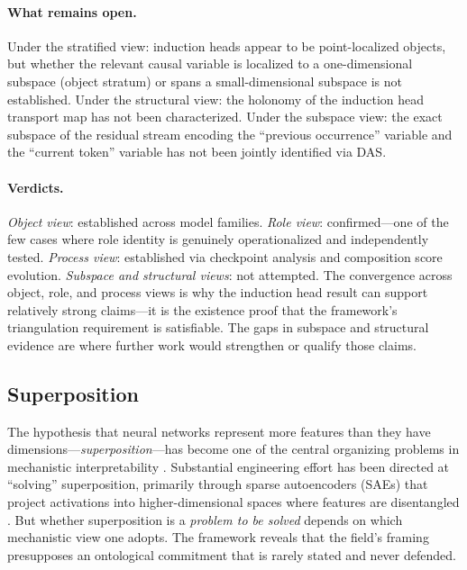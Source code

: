 \documentclass{article}
\begin{document}
\paragraph{What remains open.}
Under the stratified view: induction heads appear to be point-localized
objects, but whether the relevant causal variable is localized to a
one-dimensional subspace (object stratum) or spans a small-dimensional
subspace is not established.  Under the structural view: the holonomy
of the induction head transport map has not been characterized.  Under
the subspace view: the exact subspace of the residual stream encoding
the ``previous occurrence'' variable and the ``current token'' variable
has not been jointly identified via DAS.

\paragraph{Verdicts.}
\emph{Object view}: established across model families.
\emph{Role view}: confirmed---one of the few cases where role identity
is genuinely operationalized and independently tested.
\emph{Process view}: established via checkpoint analysis and composition
score evolution.
\emph{Subspace and structural views}: not attempted.
The convergence across object, role, and process views is why the
induction head result can support relatively strong claims---it is the
existence proof that the framework's triangulation requirement is
satisfiable.  The gaps in subspace and structural evidence are where
further work would strengthen or qualify those claims.

\subsection{Superposition}
\label{sec:worked-superposition}

The hypothesis that neural networks represent more features than they have dimensions---\emph{superposition}---has become one of the central organizing problems in mechanistic interpretability \citep{elhage2022superposition}. Substantial engineering effort has been directed at ``solving'' superposition, primarily through sparse autoencoders (SAEs) that project activations into higher-dimensional spaces where features are disentangled \citep{bricken2023, templeton2024}. But whether superposition is a \emph{problem to be solved} depends on which mechanistic view one adopts. The framework reveals that the field's framing presupposes an ontological commitment that is rarely stated and never defended.
\end{document}
